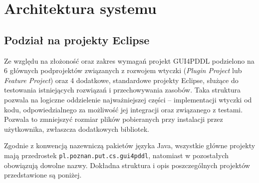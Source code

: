 \chapter{Architektura systemu}
\section{Podział na projekty Eclipse}
Ze względu na złożoność oraz zakres wymagań projekt GUI4PDDL podzielono na 6 głównych podprojektów związanych z rozwojem wtyczki (\textit{Plugin Project} lub \textit{Feature Project}) oraz 4 dodatkowe, standardowe projekty Eclipse, służące do testowania istniejących rozwiązań i przechowywania zasobów. Taka struktura pozwala na logiczne oddzielenie najważniejszej części -- implementacji wtyczki od kodu, odpowiedzialnego za możliwość jej integracji oraz związanego z testami. Pozwala to zmniejszyć rozmiar plików pobieranych przy instalacji przez użytkownika, zwłaszcza dodatkowych bibliotek.

Zgodnie z konwencją nazewniczą pakietów języka Java, wszystkie główne projekty mają przedrostek \texttt{pl.poznan.put.cs.gui4pddl}, natomiast w pozostałych obowiązują dowolne nazwy. Dokładna struktura i opis poszczególnych projektów przedstawione są poniżej.

